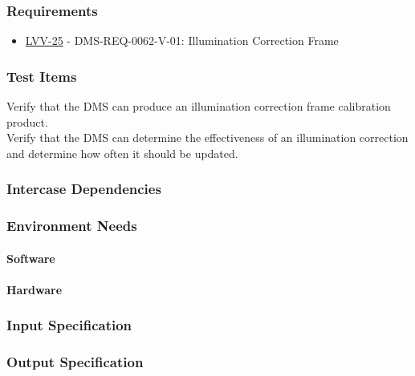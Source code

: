 \subsubsection{Requirements}
\begin{itemize}
\item \href{https://jira.lsstcorp.org/browse/LVV-25}{LVV-25} - DMS-REQ-0062-V-01: Illumination Correction Frame
\end{itemize}

\subsubsection{Test Items}
Verify that the DMS can produce an illumination correction frame
calibration product.\\
Verify that the DMS can determine the effectiveness of an illumination
correction and determine how often it should be updated.



\subsubsection{Intercase Dependencies}

\subsubsection{Environment Needs}

\paragraph{Software}

\paragraph{Hardware}

\subsubsection{Input Specification}

\subsubsection{Output Specification}

